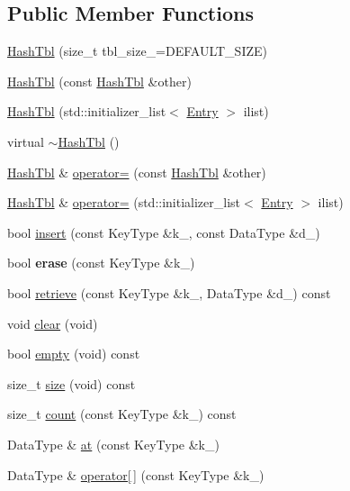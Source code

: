 \subsection*{Public Member Functions}
\begin{DoxyCompactItemize}
\item 
\hyperlink{classac_1_1_hash_tbl_ac02d4c4a0982bb5f8cc74719ed378b80}{Hash\+Tbl} (size\+\_\+t tbl\+\_\+size\+\_\+=D\+E\+F\+A\+U\+L\+T\+\_\+\+S\+I\+ZE)
\item 
\hyperlink{classac_1_1_hash_tbl_a01ae3d3c982c76c68d189515894773c5}{Hash\+Tbl} (const \hyperlink{classac_1_1_hash_tbl}{Hash\+Tbl} \&other)
\item 
\hyperlink{classac_1_1_hash_tbl_ab88aa3e7c646fe6310bea58097a72dc1}{Hash\+Tbl} (std\+::initializer\+\_\+list$<$ \hyperlink{classac_1_1_hash_entry}{Entry} $>$ ilist)
\item 
virtual \hyperlink{classac_1_1_hash_tbl_a5a82580a5f67dd0b0b90225b1090b751}{$\sim$\+Hash\+Tbl} ()
\item 
\hyperlink{classac_1_1_hash_tbl}{Hash\+Tbl} \& \hyperlink{classac_1_1_hash_tbl_ab0907d777c09da3d1071c30a96939c71}{operator=} (const \hyperlink{classac_1_1_hash_tbl}{Hash\+Tbl} \&other)
\item 
\hyperlink{classac_1_1_hash_tbl}{Hash\+Tbl} \& \hyperlink{classac_1_1_hash_tbl_a13febc90fbc2417ec7eff89dd282cd48}{operator=} (std\+::initializer\+\_\+list$<$ \hyperlink{classac_1_1_hash_entry}{Entry} $>$ ilist)
\item 
bool \hyperlink{classac_1_1_hash_tbl_a219a559a1a07170cc0679c5d1dfb3758}{insert} (const Key\+Type \&k\+\_\+, const Data\+Type \&d\+\_\+)
\item 
\mbox{\label{classac_1_1_hash_tbl_a996ce4b96a07d809089697a25aeda3bd}} 
bool {\bfseries erase} (const Key\+Type \&k\+\_\+)
\item 
bool \hyperlink{classac_1_1_hash_tbl_afd9798982409ae5a1955259190fd175e}{retrieve} (const Key\+Type \&k\+\_\+, Data\+Type \&d\+\_\+) const
\item 
void \hyperlink{classac_1_1_hash_tbl_a4fda203a257af1e3913128f03926878f}{clear} (void)
\item 
bool \hyperlink{classac_1_1_hash_tbl_a980e0609d4838c8afb7fa63a94ab6f7e}{empty} (void) const
\item 
size\+\_\+t \hyperlink{classac_1_1_hash_tbl_a45333095393049ed1e67859e99ab3701}{size} (void) const
\item 
size\+\_\+t \hyperlink{classac_1_1_hash_tbl_a298f6cb0fe45caa944a0c2bf465397b2}{count} (const Key\+Type \&k\+\_\+) const
\item 
Data\+Type \& \hyperlink{classac_1_1_hash_tbl_ac0933c629084aa2c996ecadc9dcee451}{at} (const Key\+Type \&k\+\_\+)
\item 
Data\+Type \& \hyperlink{classac_1_1_hash_tbl_a2afa09f4f299b65c575675152ba4415b}{operator\mbox{[}$\,$\mbox{]}} (const Key\+Type \&k\+\_\+)
\end{DoxyCompactItemize}
